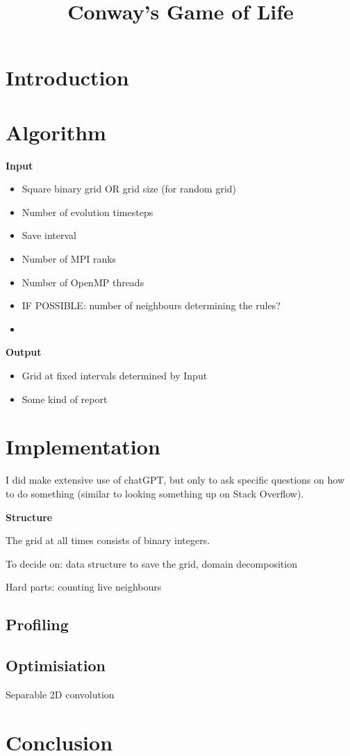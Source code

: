 \documentclass[a4paper]{article}
\title{Conway's Game of Life}
\begin{document}
\maketitle

\section*{Introduction}


\section*{Algorithm}

\textbf{Input}
\begin{itemize}
    \item Square binary grid OR grid size (for random grid)
    \item Number of evolution timesteps
    \item Save interval
    \item Number of MPI ranks
    \item Number of OpenMP threads
    \item IF POSSIBLE: number of neighbours determining the rules?
    \item {}
\end{itemize}

\textbf{Output}
\begin{itemize}
    \item Grid at fixed intervals determined by Input
    \item Some kind of report
\end{itemize}

\section*{Implementation}

I did make extensive use of chatGPT, but only to ask specific questions on how to do something (similar to looking something up on Stack Overflow).


\textbf{Structure}

The grid at all times consists of binary integers.

To decide on: data structure to save the grid, domain decomposition

Hard parts: counting live neighbours

\subsection*{Profiling}

\subsection*{Optimisiation}

Separable 2D convolution

\section*{Conclusion}
\end{document}

